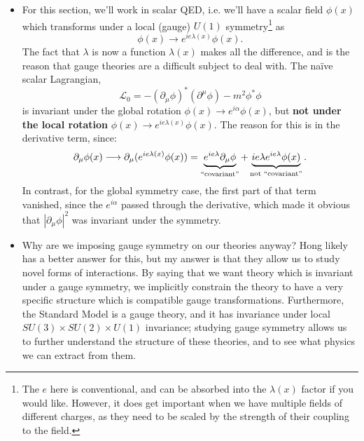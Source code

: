 \documentclass[12pt, oneside]{article}   	%
\theoremstyle{definition}
\begin{document}
\begin{itemize}
	
	\item For this section, we'll work in scalar QED, i.e. we'll have a scalar field $\phi(x)$ which transforms under a local (gauge) $U(1)$ symmetry\footnote{The $e$ here is conventional, and can be absorbed into the $\lambda(x)$ factor if you would like. However, it does get important when we have multiple fields of different charges, as they need to be scaled by the strength of their coupling to the field.} as
	\begin{equation}
		\phi(x)\longrightarrow e^{i e \lambda(x)}\phi(x).
	\end{equation}
	The fact that $\lambda$ is now a function $\lambda(x)$ makes all the difference, and is the reason that gauge theories are a difficult subject to deal with. The na\"ive scalar Lagrangian,
	\begin{equation}
		\mathcal L_0 = - (\partial_\mu\phi)^* (\partial^\mu\phi) - m^2 \phi^* \phi \label{eq:complex_lagrangian}
	\end{equation}
	is invariant under the global rotation $\phi(x)\rightarrow e^{i\alpha} \phi(x)$, but \textbf{not under the local rotation} $\phi(x)\longrightarrow e^{i e \lambda(x)} \phi(x)$. The reason for this is in the derivative term, since:
	\begin{equation}
		\partial_\mu\phi(x)\longrightarrow \partial_\mu (e^{i e \lambda(x)} \phi(x)) = \underbrace{e^{i e \lambda} \partial_\mu \phi}_{\textnormal{``covariant''}} + \underbrace{i e \lambda e^{i e \lambda} \phi(x)}_{\textnormal{not ``covariant''}}.
	\end{equation}
	In contrast, for the global symmetry case, the first part of that term vanished, since the $e^{i\alpha}$ passed through the derivative, which made it obvious that $|\partial_\mu \phi |^2$ was invariant under the symmetry. 
	
	\item Why are we imposing gauge symmetry on our theories anyway? Hong likely has a better answer for this, but my answer is that they allow us to study novel forms of interactions. By saying that we want theory which is invariant under a gauge symmetry, we implicitly constrain the theory to have a very specific structure which is compatible gauge transformations. Furthermore, the Standard Model is a gauge theory, and it has invariance under local $SU(3)\times SU(2)\times U(1)$ invariance; studying gauge symmetry allows us to further understand the structure of these theories, and to see what physics we can extract from them. 
	

\end{itemize}
\end{document}
